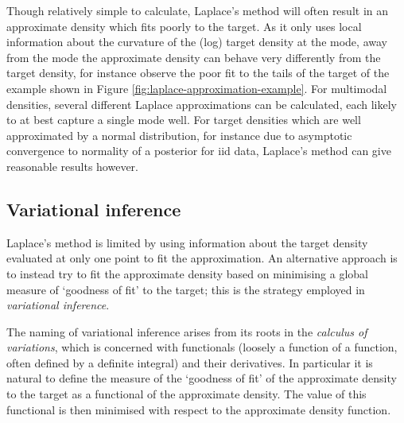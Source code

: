 Though relatively simple to calculate, Laplace's method will often result in an approximate density which fits poorly to the target. As it only uses local information about the curvature of the (log) target density at the mode, away from the mode the approximate density can behave very differently from the target density, for instance observe the poor fit to the tails of the target of the example shown in Figure \ref{fig:laplace-approximation-example}. For multimodal densities, several different Laplace approximations can be calculated, each likely to at best capture a single mode well. For target densities which are well approximated by a normal distribution, for instance due to asymptotic convergence to normality of a posterior for \ac{iid} data, Laplace's method can give reasonable results however. 

\subsection{Variational inference}

Laplace's method is limited by using information about the target density evaluated at only one point to fit the approximation. An alternative approach is to instead try to fit the approximate density based on minimising a global measure of `goodness of fit' to the target; this is the strategy employed in \emph{variational inference}.

The naming of variational inference arises from its roots in the \emph{calculus of variations}, which is concerned with functionals (loosely a function of a function, often defined by a definite integral) and their derivatives. In particular it is natural to define the measure of the `goodness of fit' of the approximate density to the target as a functional of the approximate density. The value of this functional is then minimised with respect to the approximate density function. %

